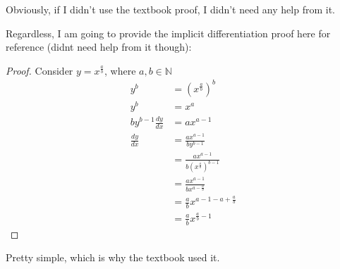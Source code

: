Obviously, if I didn't use the textbook proof, I didn't need any help from it.

Regardless, I am going to provide the implicit differentiation proof here for reference (didnt need help from it though):

\begin{proof}
Consider $y = x^{\frac{a}{b}}$, where $a, b \in \mathbb{N}$
\begin{align}
y^b &= (x^{\frac{a}{b}})^b \\
y^b &= x^a \\
b y^{b-1} \frac{dy}{dx} &= a x^{a-1} \\
\frac{dy}{dx} &= \frac{a x^{a-1}}{b y^{b-1}} \\
&= \frac{a x^{a-1}}{b (x^{\frac{a}{b}})^{b-1}} \\
&= \frac{a x^{a-1}}{b x^{a - \frac{a}{b}}} \\
&= \frac{a}{b} x^{a - 1 - a + \frac{a}{b}} \\
&= \frac{a}{b} x^{\frac{a}{b} - 1}
\end{align}
\end{proof}

Pretty simple, which is why the textbook used it.

